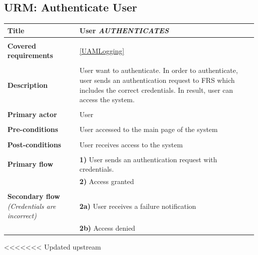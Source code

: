 \documentclass[a4paper,11pt]{article}
\begin{document}
\subsection{URM: Authenticate User}

\begin{tabular}{|p{3.5cm}|p{11.5cm}|} \hline
    \textbf{Title} &   User \emph{AUTHENTICATES}

    \\ \hline \rowcolor{Gray} & \\ \hline

    \textbf{Covered requirements} & \ref{UAMLogging}
  
    \\ \hline \rowcolor{Gray} & \\ \hline 
  
    \textbf{Description} &  User want to authenticate. In order to authenticate, user sends an authentication request to FRS which includes the correct credentials. In result, user can access the system. 
   
    \\ \hline \rowcolor{Gray} & \\ \hline 
   
    \textbf{Primary actor} & User   
   
    \\ \hline \rowcolor{Gray} & \\ \hline  
   
    \textbf{Pre-conditions} &   User accessed to the main page of the system 
   
    \\ \hline \rowcolor{Gray} & \\ \hline 
   
    \textbf{Post-conditions} &   User receives access to the system 
   
    \\ \hline \rowcolor{Gray} & \\ \hline  
    
    \textbf{Primary flow} &  
    \textbf{1)} User sends an authentication request with credentials.  \\& 
    \textbf{2)} Access granted
    
    \\ \hline \rowcolor{Gray} & \\ \hline  
    
    \textbf{Secondary flow} \emph{(Credentials are incorrect)} &  
    \textbf{2a)} User receives a failure notification \\ &
    \textbf{2b)} Access denied
    
    \\ \hline   
\end{tabular} 
<<<<<<< Updated upstream
\end{document}
